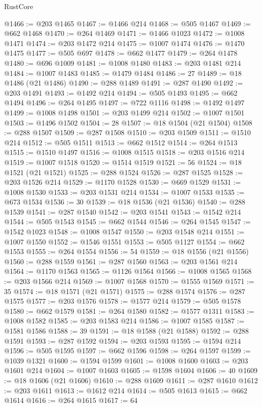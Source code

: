 \begin{lexlean}{RustCore}
\begin{coremodule}
@1466 := @203 @1465
@1467 := @1466 @214
@1468 := @505 @1467
@1469 := @662 @1468
@1470 := @264 @1469
@1471 := @1466 @1023
@1472 := @1008 @1471
@1474 := @203 @1472 @214
@1475 := @1007 @1474
@1476 := @1470 @1475
@1477 := @505 @697
@1478 := @662 @1477
@1479 := @264 @1478
@1480 := @696 @1009
@1481 := @1008 @1480
@1483 := @203 @1481 @214
@1484 := @1007 @1483
@1485 := @1479 @1484
@1486 := 27
@1489 := @18 @1486 (@21 @1486)
@1490 := @288 @1489
@1491 := @287 @1490
@1492 := @203 @1491
@1493 := @1492 @214
@1494 := @505 @1493
@1495 := @662 @1494
@1496 := @264 @1495
@1497 := @722 @1116
@1498 := @1492 @1497
@1499 := @1008 @1498
@1501 := @203 @1499 @214
@1502 := @1007 @1501
@1503 := @1496 @1502
@1504 := 28
@1507 := @18 @1504 (@21 @1504)
@1508 := @288 @1507
@1509 := @287 @1508
@1510 := @203 @1509
@1511 := @1510 @214
@1512 := @505 @1511
@1513 := @662 @1512
@1514 := @264 @1513
@1515 := @1510 @1497
@1516 := @1008 @1515
@1518 := @203 @1516 @214
@1519 := @1007 @1518
@1520 := @1514 @1519
@1521 := 56
@1524 := @18 @1521 (@21 @1521)
@1525 := @288 @1524
@1526 := @287 @1525
@1528 := @203 @1526 @214
@1529 := @1170 @1528
@1530 := @669 @1529
@1531 := @1008 @1530
@1533 := @203 @1531 @214
@1534 := @1007 @1533
@1535 := @673 @1534
@1536 := 30
@1539 := @18 @1536 (@21 @1536)
@1540 := @288 @1539
@1541 := @287 @1540
@1542 := @203 @1541
@1543 := @1542 @214
@1544 := @505 @1543
@1545 := @662 @1544
@1546 := @264 @1545
@1547 := @1542 @1023
@1548 := @1008 @1547
@1550 := @203 @1548 @214
@1551 := @1007 @1550
@1552 := @1546 @1551
@1553 := @505 @1127
@1554 := @662 @1553
@1555 := @264 @1554
@1556 := 54
@1559 := @18 @1556 (@21 @1556)
@1560 := @288 @1559
@1561 := @287 @1560
@1563 := @203 @1561 @214
@1564 := @1170 @1563
@1565 := @1126 @1564
@1566 := @1008 @1565
@1568 := @203 @1566 @214
@1569 := @1007 @1568
@1570 := @1555 @1569
@1571 := 35
@1574 := @18 @1571 (@21 @1571)
@1575 := @288 @1574
@1576 := @287 @1575
@1577 := @203 @1576
@1578 := @1577 @214
@1579 := @505 @1578
@1580 := @662 @1579
@1581 := @264 @1580
@1582 := @1577 @1311
@1583 := @1008 @1582
@1585 := @203 @1583 @214
@1586 := @1007 @1585
@1587 := @1581 @1586
@1588 := 39
@1591 := @18 @1588 (@21 @1588)
@1592 := @288 @1591
@1593 := @287 @1592
@1594 := @203 @1593
@1595 := @1594 @214
@1596 := @505 @1595
@1597 := @662 @1596
@1598 := @264 @1597
@1599 := @1039 @1321
@1600 := @1594 @1599
@1601 := @1008 @1600
@1603 := @203 @1601 @214
@1604 := @1007 @1603
@1605 := @1598 @1604
@1606 := 40
@1609 := @18 @1606 (@21 @1606)
@1610 := @288 @1609
@1611 := @287 @1610
@1612 := @203 @1611
@1613 := @1612 @214
@1614 := @505 @1613
@1615 := @662 @1614
@1616 := @264 @1615
@1617 := 64

\end{coremodule}
\end{lexlean}
